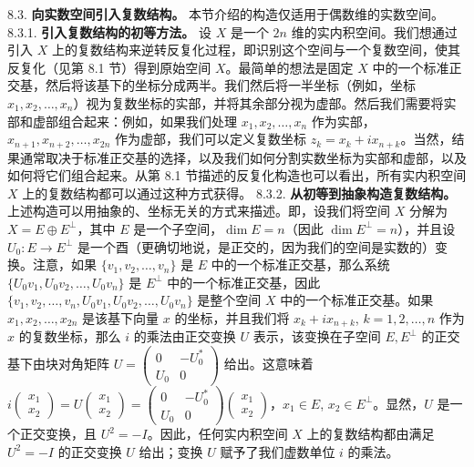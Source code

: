 8.3. \textbf{向实数空间引入复数结构。} 本节介绍的构造仅适用于偶数维的实数空间。
8.3.1. \textbf{引入复数结构的初等方法。} 设 $X$ 是一个 $2n$ 维的实内积空间。我们想通过引入 $X$ 上的复数结构来逆转反复化过程，即识别这个空间与一个复数空间，使其反复化（见第 8.1 节）得到原始空间 $X$。最简单的想法是固定 $X$ 中的一个标准正交基，然后将该基下的坐标分成两半。我们然后将一半坐标（例如，坐标 $x_1, x_2, \dots, x_n$）视为复数坐标的实部，并将其余部分视为虚部。然后我们需要将实部和虚部组合起来：例如，如果我们处理 $x_1, x_2, \dots, x_n$ 作为实部，$x_{n+1}, x_{n+2}, \dots, x_{2n}$ 作为虚部，我们可以定义复数坐标 $z_k = x_k + ix_{n+k}$。当然，结果通常取决于标准正交基的选择，以及我们如何分割实数坐标为实部和虚部，以及如何将它们组合起来。从第 8.1 节描述的反复化构造也可以看出，所有实内积空间 $X$ 上的复数结构都可以通过这种方式获得。
8.3.2. \textbf{从初等到抽象构造复数结构。} 上述构造可以用抽象的、坐标无关的方式来描述。即，设我们将空间 $X$ 分解为 $X = E \oplus E^\perp$，其中 $E$ 是一个子空间，$\dim E = n$（因此 $\dim E^\perp = n$），并且设 $U_0: E \to E^\perp$ 是一个酉（更确切地说，是正交的，因为我们的空间是实数的）变换。注意，如果 $\{v_1, v_2, \dots, v_n\}$ 是 $E$ 中的一个标准正交基，那么系统 $\{U_0 v_1, U_0 v_2, \dots, U_0 v_n\}$ 是 $E^\perp$ 中的一个标准正交基，因此 $\{v_1, v_2, \dots, v_n, U_0 v_1, U_0 v_2, \dots, U_0 v_n\}$ 是整个空间 $X$ 中的一个标准正交基。如果 $x_1, x_2, \dots, x_{2n}$ 是该基下向量 $x$ 的坐标，并且我们将 $x_k + ix_{n+k}$, $k=1, 2, \dots, n$ 作为 $x$ 的复数坐标，那么 $i$ 的乘法由正交变换 $U$ 表示，该变换在子空间 $E, E^\perp$ 的正交基下由块对角矩阵 $U = \begin{pmatrix} 0 & -U_0^* \\ U_0 & 0 \end{pmatrix}$ 给出。这意味着 $i \begin{pmatrix} x_1 \\ x_2 \end{pmatrix} = U \begin{pmatrix} x_1 \\ x_2 \end{pmatrix} = \begin{pmatrix} 0 & -U_0^* \\ U_0 & 0 \end{pmatrix} \begin{pmatrix} x_1 \\ x_2 \end{pmatrix}$，$x_1 \in E$, $x_2 \in E^\perp$。显然，$U$ 是一个正交变换，且 $U^2 = -I$。因此，任何实内积空间 $X$ 上的复数结构都由满足 $U^2 = -I$ 的正交变换 $U$ 给出；变换 $U$ 赋予了我们虚数单位 $i$ 的乘法。




